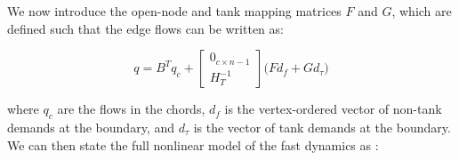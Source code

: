 

We now introduce the open-node and tank mapping matrices ${F}$ and ${G}$, which are defined such that the edge flows can be written as:

\begin{equation}\label{eq:FlowDecomposition}
		q = B^T q_c +	\begin{bmatrix} 0_{c \times n-1} \\ {H}_T^{-1} \end{bmatrix}\Big({F}d_f + {G}d_\tau \Big)
\end{equation}

where $q_c$ are the flows in the chords, $d_f$ is the vertex-ordered vector of non-tank demands at the boundary, and $d_\tau$ is the vector of tank demands at the boundary. We can then state the full nonlinear model of the fast dynamics as \cite{Rathore1030,Jensen}:




